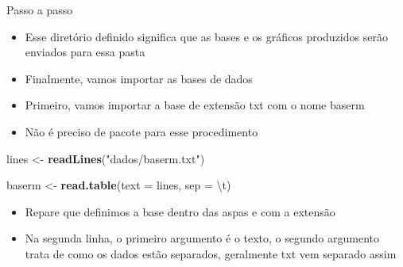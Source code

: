 \documentclass[
  10pt,
  ignorenonframetext,
]{beamer}
\newenvironment{Shaded}{\begin{snugshade}}{\end{snugshade}}
\newcommand{\CharTok}[1]{\textcolor[rgb]{0.31,0.60,0.02}{#1}}
\newcommand{\DataTypeTok}[1]{\textcolor[rgb]{0.13,0.29,0.53}{#1}}
\newcommand{\KeywordTok}[1]{\textcolor[rgb]{0.13,0.29,0.53}{\textbf{#1}}}
\newcommand{\NormalTok}[1]{#1}
\newcommand{\StringTok}[1]{\textcolor[rgb]{0.31,0.60,0.02}{#1}}
\providecommand{\tightlist}{%
  \setlength{\itemsep}{0pt}\setlength{\parskip}{0pt}}
\begin{document}
\begin{frame}[fragile]{Passo a passo}
\protect\hypertarget{passo-a-passo-1}{}
\begin{itemize}
\tightlist
\item
  Esse diretório definido significa que as bases e os gráficos
  produzidos serão enviados para essa pasta
\item
  Finalmente, vamos importar as bases de dados
\item
  Primeiro, vamos importar a base de extensão txt com o nome baserm
\item
  Não é preciso de pacote para esse procedimento
\end{itemize}

\begin{Shaded}
\begin{Highlighting}[]
\NormalTok{lines \textless{}{-}}\StringTok{ }\KeywordTok{readLines}\NormalTok{(}\StringTok{"dados/baserm.txt"}\NormalTok{)}

\NormalTok{baserm \textless{}{-}}\StringTok{ }\KeywordTok{read.table}\NormalTok{(}\DataTypeTok{text =}\NormalTok{ lines, }\DataTypeTok{sep =} \StringTok{\textquotesingle{}}\CharTok{\textbackslash{}t}\StringTok{\textquotesingle{}}\NormalTok{)}
\end{Highlighting}
\end{Shaded}

\begin{itemize}
\tightlist
\item
  Repare que definimos a base dentro das aspas e com a extensão
\item
  Na segunda linha, o primeiro argumento é o texto, o segundo argumento
  trata de como os dados estão separados, geralmente txt vem separado
  assim
\end{itemize}
\end{frame}
\end{document}
